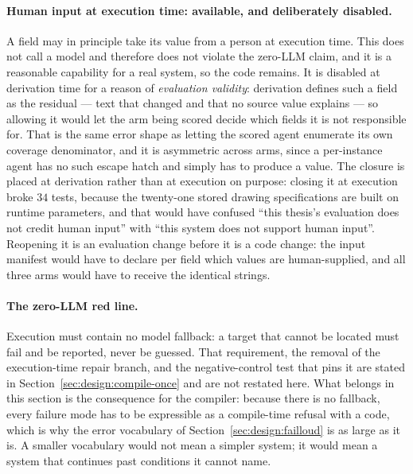 \paragraph{Human input at execution time: available, and deliberately disabled.}
A field may in principle take its value from a person at execution time. This does not call a
model and therefore does not violate the zero-LLM claim, and it is a reasonable capability for
a real system, so the code remains. It is disabled at derivation time for a reason of
\emph{evaluation validity}: derivation defines such a field as the residual --- text that
changed and that no source value explains --- so allowing it would let the arm being scored
decide which fields it is not responsible for. That is the same error shape as letting the
scored agent enumerate its own coverage denominator, and it is asymmetric across arms, since a
per-instance agent has no such escape hatch and simply has to produce a value. The closure is
placed at derivation rather than at execution on purpose: closing it at execution broke $34$
tests, because the twenty-one stored drawing specifications are built on runtime parameters,
and that would have confused ``this thesis's evaluation does not credit human input'' with
``this system does not support human input''. Reopening it is an evaluation change before it is
a code change: the input manifest would have to declare per field which values are
human-supplied, and all three arms would have to receive the identical strings.

\paragraph{The zero-LLM red line.}
Execution must contain no model fallback: a target that cannot be located must fail and be
reported, never be guessed. That requirement, the removal of the execution-time repair branch,
and the negative-control test that pins it are stated in Section~\ref{sec:design:compile-once}
and are not restated here. What belongs in this section is the consequence for the compiler:
because there is no fallback, every failure mode has to be expressible as a compile-time
refusal with a code, which is why the error vocabulary of Section~\ref{sec:design:failloud} is
as large as it is. A smaller vocabulary would not mean a simpler system; it would mean a system
that continues past conditions it cannot name.

